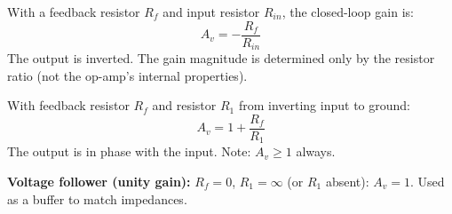 \begin{lawbox}
With a feedback resistor $R_f$ and input resistor
$R_{in}$, the closed-loop gain is:
\[
  A_v = -\frac{R_f}{R_{in}}
\]
The output is inverted. The gain magnitude is
determined only by the resistor ratio (not the
op-amp's internal properties).
\end{lawbox}

\begin{lawbox}
With feedback resistor $R_f$ and resistor $R_1$
from inverting input to ground:
\[
  A_v = 1 + \frac{R_f}{R_1}
\]
The output is in phase with the input. Note:
$A_v \geq 1$ always.

\textbf{Voltage follower (unity gain):} $R_f = 0$,
$R_1 = \infty$ (or $R_1$ absent): $A_v = 1$.
Used as a buffer to match impedances.
\end{lawbox}

